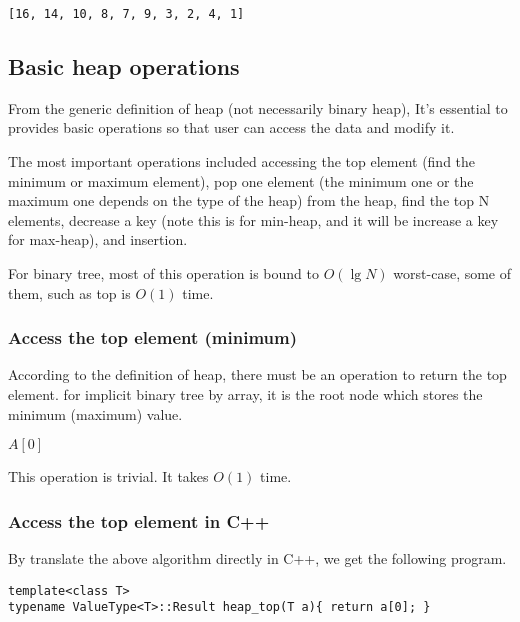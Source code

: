 \documentclass{article}
\begin{document}
\begin{verbatim}
[16, 14, 10, 8, 7, 9, 3, 2, 4, 1]
\end{verbatim}

\subsection{Basic heap operations}

From the generic definition of heap (not necessarily binary heap),
It's essential to provides basic operations so that user can access
the data and modify it.

The most important operations included accessing the top element 
(find the minimum or maximum element), pop one element (the minimum
one or the maximum one depends on the type of the heap)
from the heap, find the top N elements, decrease a key (note this 
is for min-heap, and it will be increase a key for max-heap), and
insertion.

For binary tree, most of this operation is bound to $O(\lg{N})$ worst-case,
some of them, such as top is $O(1)$ time.

\subsubsection{Access the top element (minimum)}
According to the definition of heap, there must be an operation to
return the top element. for implicit binary tree by array, it is the
root node which stores the minimum (maximum) value.

\begin{algorithmic}[1]
  \State \Return $A[0]$
\EndFunction
\end{algorithmic}

This operation is trivial. It takes $O(1)$ time.

\subsubsection*{Access the top element in C++}

By translate the above algorithm directly in C++, we get the 
following program.

\lstset{language=C++}
\begin{lstlisting}
template<class T>
typename ValueType<T>::Result heap_top(T a){ return a[0]; }
\end{lstlisting}
\end{document}
